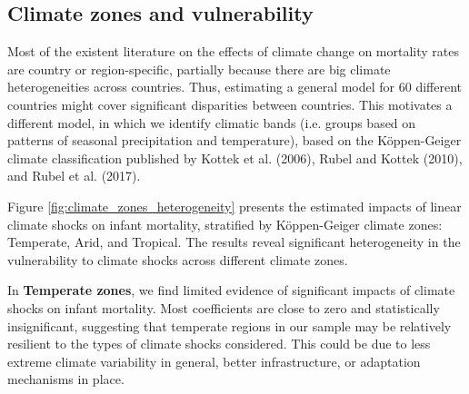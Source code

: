 \documentclass[a4paper]{article}
\begin{document}
% 








\subsection{Climate zones and vulnerability}
Most of the existent literature on the effects of climate change on mortality rates are country or region-specific, partially because there are big climate heterogeneities across countries. Thus, estimating a general model for 60 different countries might cover significant disparities between countries. This motivates a different model, in which we identify climatic bands (i.e. groups based on patterns of seasonal precipitation and temperature), based on the Köppen-Geiger climate classification published by Kottek et al. (2006), Rubel and Kottek (2010), and Rubel et al. (2017).

Figure \ref{fig:climate_zones_heterogeneity} presents the estimated impacts of linear climate shocks on infant mortality, stratified by Köppen-Geiger climate zones: Temperate, Arid, and Tropical.  The results reveal significant heterogeneity in the vulnerability to climate shocks across different climate zones.

In \textbf{Temperate zones}, we find limited evidence of significant impacts of climate shocks on infant mortality.  Most coefficients are close to zero and statistically insignificant, suggesting that temperate regions in our sample may be relatively resilient to the types of climate shocks considered.  This could be due to less extreme climate variability in general, better infrastructure, or adaptation mechanisms in place.
\end{document}
